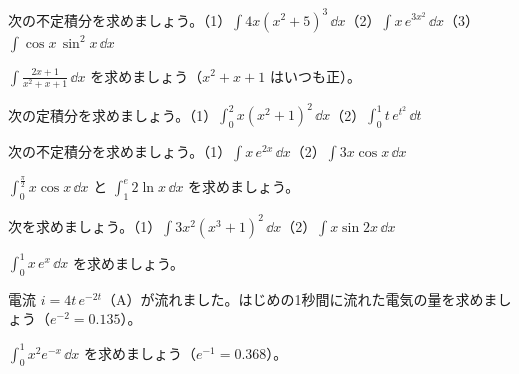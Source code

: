 \bkendproblems
{}

\bkproblem 次の不定積分を求めましょう。\quad（1）$\displaystyle\int4x(x^2+5)^3\,\dd x$\quad（2）$\displaystyle\int x\,e^{3x^2}\,\dd x$\quad（3）$\displaystyle\int\cos x\,\sin^2x\,\dd x$

\bkproblem $\displaystyle\int\frac{2x+1}{x^2+x+1}\,\dd x$ を求めましょう（$x^2+x+1$ はいつも正）。

\bkproblem 次の定積分を求めましょう。\quad（1）$\displaystyle\int_0^2x(x^2+1)^2\,\dd x$\quad（2）$\displaystyle\int_0^1t\,e^{t^2}\,\dd t$

\bkproblem 次の不定積分を求めましょう。\quad（1）$\displaystyle\int x\,e^{2x}\,\dd x$\quad（2）$\displaystyle\int3x\cos x\,\dd x$

\bkproblem $\displaystyle\int_0^{\frac{\pi}{2}}x\cos x\,\dd x$ と $\displaystyle\int_1^e2\ln x\,\dd x$ を求めましょう。

\bkproblem 次を求めましょう。\quad（1）$\displaystyle\int3x^2(x^3+1)^2\,\dd x$\quad（2）$\displaystyle\int x\sin2x\,\dd x$

\bkproblem $\displaystyle\int_0^1x\,e^x\,\dd x$ を求めましょう。


\bkproblem 電流 $i=4t\,e^{-2t}$（A）が流れました。はじめの1秒間に流れた電気の量を求めましょう（$e^{-2}=0.135$）。

\bkproblem $\displaystyle\int_0^1x^2e^{-x}\,\dd x$ を求めましょう（$e^{-1}=0.368$）。

